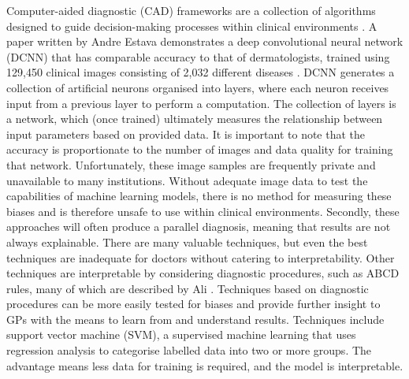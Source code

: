 Computer-aided diagnostic (CAD) frameworks are a collection of algorithms designed to guide decision-making processes within clinical environments \cite{Dick2019}. A paper written by Andre Estava demonstrates a deep convolutional neural network (DCNN) that has comparable accuracy to that of dermatologists, trained using 129,450 clinical images consisting of 2,032 different diseases \cite{Andre2017}. DCNN generates a collection of artificial neurons organised into layers, where each neuron receives input from a previous layer to perform a computation. The collection of layers is a network, which (once trained) ultimately measures the relationship between input parameters based on provided data. It is important to note that the accuracy is proportionate to the number of images and data quality for training that network. Unfortunately, these image samples are frequently private and unavailable to many institutions. Without adequate image data to test the capabilities of machine learning models, there is no method for measuring these biases and is therefore unsafe to use within clinical environments. Secondly, these approaches will often produce a parallel diagnosis, meaning that results are not always explainable\cite{Lipton2018}. There are many valuable techniques, but even the best techniques are inadequate for doctors without catering to interpretability. Other techniques are interpretable by considering diagnostic procedures, such as ABCD rules, many of which are described by Ali \cite{Ali2020}. Techniques based on diagnostic procedures can be more easily tested for biases and provide further insight to GPs with the means to learn from and understand results. Techniques include support vector machine (SVM), a supervised machine learning that uses regression analysis to categorise labelled data into two or more groups. The advantage means less data for training is required, and the model is interpretable.

